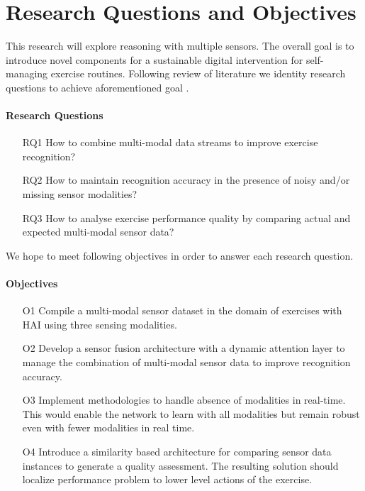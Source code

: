 \section{Research Questions and Objectives}
\label{sec:research_questions}
This research will explore reasoning with multiple sensors. The overall goal is to introduce novel components for a sustainable digital intervention for self-managing exercise routines. Following review of literature we identity research questions to achieve aforementioned goal . 

\paragraph*{Research Questions}
\label{sec:rq}
\begin{enumerate}
\item [RQ1] How to combine multi-modal data streams to improve exercise recognition?
\item [RQ2] How to maintain recognition accuracy in the presence of noisy and/or missing sensor modalities?
\item [RQ3] How to analyse exercise performance quality by comparing actual and expected multi-modal sensor data?
\end{enumerate}

\noindent We hope to meet following objectives in order to answer each research question. 

\paragraph*{Objectives}
\label{sec:outcomes}

\begin{itemize}
\item [O1] Compile a multi-modal sensor dataset in the domain of exercises with HAI using three sensing modalities. 

\item [O2] Develop a sensor fusion architecture with a dynamic attention layer to manage the combination of multi-modal sensor data to improve recognition accuracy. 

\item [O3] Implement methodologies to handle absence of modalities in real-time. 
This would enable the network to learn with all modalities but remain robust even with fewer modalities in real time. 

\item [O4] Introduce a similarity based architecture for comparing sensor data instances to generate a quality assessment. The resulting solution should localize performance problem to lower level actions of the exercise. 
\end{itemize}